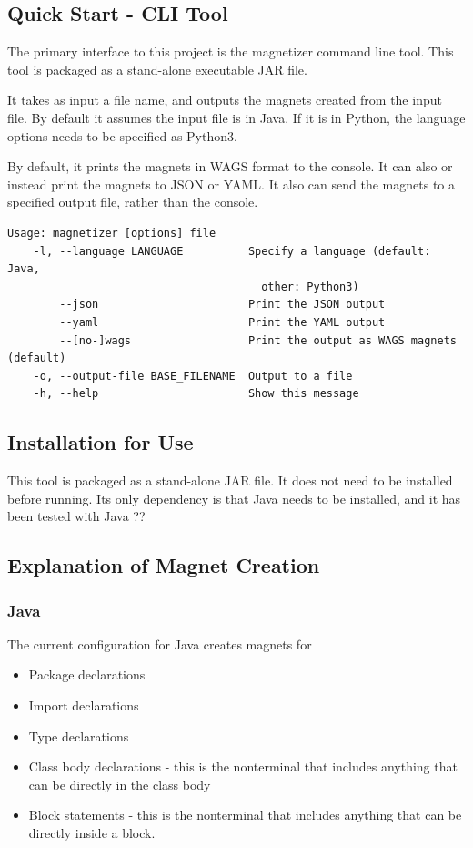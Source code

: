 \documentclass[letter,10pt]{article}
\begin{document}
\subsection{Quick Start - CLI Tool}

The primary interface to this project is the magnetizer command line 
tool.  This tool is packaged as a stand-alone executable JAR file. 

It takes as input a file name, and outputs the magnets created 
from the input file. By default it assumes the input file is in Java. 
If it is in Python, the language options needs to be specified as 
Python3. 

By default, it prints the magnets in WAGS format to the console. It can 
also or instead print the magnets to JSON or YAML. It also can 
send the magnets to a specified output file, rather than the console. 

\begin{verbatim}
Usage: magnetizer [options] file
    -l, --language LANGUAGE          Specify a language (default: Java, 
                                       other: Python3)
        --json                       Print the JSON output
        --yaml                       Print the YAML output
        --[no-]wags                  Print the output as WAGS magnets 
(default)
    -o, --output-file BASE_FILENAME  Output to a file
    -h, --help                       Show this message
\end{verbatim}


\subsection{Installation for Use}
This tool is packaged as a stand-alone JAR file. It does not need to be 
installed before running. Its only dependency is that Java needs to be 
installed, and it has been tested with Java ?? 

\subsection{Explanation of Magnet Creation}


\subsubsection{Java}
The current configuration for Java creates magnets for
\begin{itemize}
 \item Package declarations
 \item Import declarations
 \item Type declarations
 \item Class body declarations - this is the nonterminal that includes 
anything that can be directly in the class body
 \item Block statements - this is the nonterminal that includes 
anything that can be directly inside a block.
\end{itemize}
\end{document}
